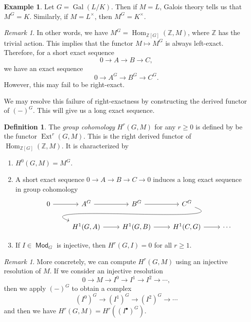 \documentclass[leqno, openany]{memoir}
\theoremstyle{definition}
\newtheorem{defn}[thm]{Definition}
\newtheorem{exm}[thm]{Example}
\theoremstyle{remark}
\newtheorem{rmk}[thm]{Remark}
\theoremstyle{plain}
\theoremstyle{definition}
\theoremstyle{remark}
\newcommand{\Z}{\mathbb{Z}}
\DeclareMathOperator{\Hom}{Hom}
\DeclareMathOperator{\Gal}{Gal}
\DeclareMathOperator{\Ext}{Ext}
\DeclareMathOperator{\Mod}{\mathsf{Mod}}
\begin{document}
\begin{exm}
    Let $G = \Gal(L/K)$. Then if $M = L$, Galois theory tells us that $M^G = K$. Similarly, if $M = L^{\times}$, then $M^G = K^{\times}$.
\end{exm}

\begin{rmk}
    In other words, we have $M^G = \Hom_{\Z[G]}(\Z, M)$, where $\Z$ has the trivial action. This implies that the functor $M \mapsto M^G$ is always left-exact. Therefore, for a short exact sequence
    \[ 0 \to A \to B \to C, \]
    we have an exact sequence
    \[ 0 \to A^G \to B^G \to C^G. \]
    However, this may fail to be right-exact.
\end{rmk}

We may resolve this failure of right-exactness by constructing the derived functor of ${(-)}^G$. This will give us a long exact sequence.

\begin{defn}
    The \textit{group cohomology} $H^r(G, M)$ for any $r \geq 0$ is defined by be the functor $\Ext^r(G, M)$. This is the right derived functor of $\Hom_{\Z[G]}(\Z, M)$. It is characterized by
    \begin{enumerate}
        \item $H^0(G, M) = M^G$.
        \item A short exact sequence $0 \to A \to B \to C \to 0$ induces a long exact sequence in group cohomology
            \begin{equation*}
            \begin{tikzcd}
                0 \arrow{r} & A^G \ar{r} & B^G \ar{r} & C^G \ar[out=-20,in=160]{dll} \\
                            & H^1(G,A) \ar{r} & H^1(G,B) \ar{r} & H^1(C,G) \ar{r} & \cdots
            \end{tikzcd}
            \end{equation*}
        \item If $I \in \Mod_G$ is injective, then $H^r(G, I) = 0$ for all $r \geq 1$.
    \end{enumerate}
\end{defn}

\begin{rmk}
    More concretely, we can compute $H^r(G, M)$ using an injective resolution of $M$. If we consider an injective resolution
    \[ 0 \to M \to I^0 \to I^1 \to I^2 \to \cdots, \]
    then we apply ${(-)}^G$ to obtain a complex
    \[ {(I^0)}^G \to {(I^1)}^G \to {(I^2)}^G \to \cdots \]
    and then we have $H^r(G, M) = H^r({(I^{\bullet})}^G)$.
\end{rmk}
\end{document}
